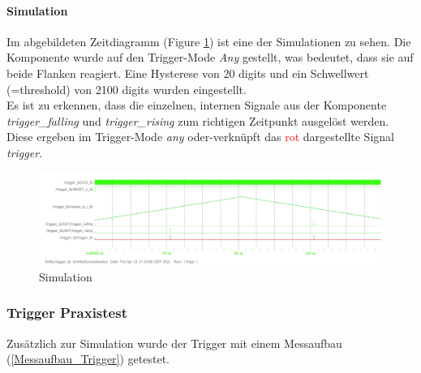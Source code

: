 \paragraph{Simulation}
Im abgebildeten Zeitdiagramm (Figure \ref{TriggerSim}) ist eine der Simulationen zu sehen. Die Komponente wurde auf den Trigger-Mode \textit{Any} gestellt, was bedeutet, dass sie auf beide Flanken reagiert. Eine Hysterese von 20 digits und ein Schwellwert (=threshold) von 2100 digits wurden eingestellt.\\Es ist zu erkennen, dass die einzelnen, internen Signale aus der Komponente \textit{trigger\_falling} und \textit{trigger\_rising} zum richtigen Zeitpunkt ausgelöst werden. Diese ergeben im Trigger-Mode \textit{any} oder-verknüpft das \textcolor{red}{rot} dargestellte Signal \textit{trigger}. 
\begin{figure}[h]
	\begin{center}
		\includegraphics[width=16cm]{SAUER/Grafiken/Trigger/Simulation.jpg}
		\caption{Simulation}
		\label{TriggerSim}
	\end{center}
\end{figure}
\subsubsection{Trigger Praxistest}
Zusätzlich zur Simulation wurde der Trigger mit einem Messaufbau (\ref{Messaufbau_Trigger}) getestet.
